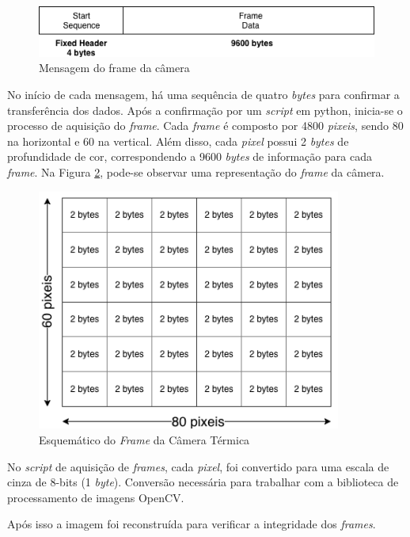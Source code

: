 		\begin{figure}[!ht]
		   \centering
		   \includegraphics[width=14cm]{Figures/frame_msg.png}
		   \caption{Mensagem do frame da câmera}
		   \label{fig:framemsg}
		\end{figure}
	
	    No início de cada mensagem, há uma sequência de quatro \textit{bytes} para confirmar a transferência dos dados. Após a confirmação por um \textit{script} em python, inicia-se o processo de aquisição do \textit{frame}. Cada \textit{frame} é composto por 4800 \textit{pixeis}, sendo 80 na horizontal e 60 na vertical. Além disso, cada \textit{pixel} possui 2 \textit{bytes} de profundidade de cor, correspondendo a 9600 \textit{bytes} de informação para cada \textit{frame}. Na Figura \ref{fig:frame_esque}, pode-se observar uma representação do \textit{frame} da câmera.
	    
	
		\begin{figure}[!ht]
		   \centering
		   \includegraphics[width=10cm]{Figures/frame_esque.png}
		   \caption{Esquemático do \textit{Frame} da Câmera Térmica}
		   \label{fig:frame_esque}
		\end{figure}
		
		No \textit{script} de aquisição de \textit{frames}, cada \textit{pixel}, foi convertido para uma escala de cinza de 8-bits (1 \textit{byte}). Conversão necessária para trabalhar com a biblioteca de processamento de imagens OpenCV.
		    
		Após isso a imagem foi reconstruída para verificar a integridade dos \textit{frames}.
	
